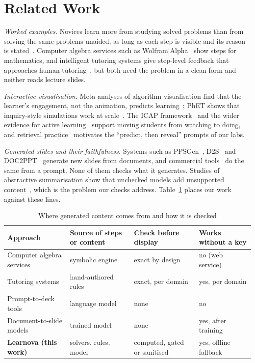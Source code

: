\documentclass[runningheads]{llncs}
\begin{document}
\section{Related Work}
\label{sec:related}
\textit{Worked examples.} Novices learn more from studying solved problems than from solving the same problems unaided, as long as
each step is visible and its reason is stated~\cite{sweller1985,atkinson2000,renkl2014}. Computer algebra services such as
Wolfram$|$Alpha~\cite{wolframalpha} show steps for mathematics, and intelligent tutoring systems give step-level feedback that
approaches human tutoring~\cite{vanlehn2011}, but both need the problem in a clean form and neither reads lecture slides.

\textit{Interactive visualisation.} Meta-analyses of algorithm visualisation find that the learner's engagement, not the animation,
predicts learning~\cite{hundhausen2002,naps2002}; PhET shows that inquiry-style simulations work at scale~\cite{wieman2008}. The
ICAP framework~\cite{chi2014} and the wider evidence for active learning~\cite{freeman2014} support moving students from watching
to doing, and retrieval practice~\cite{roediger2006} motivates the ``predict, then reveal'' prompts of our labs.

\textit{Generated slides and their faithfulness.} Systems such as PPSGen~\cite{hu2015}, D2S~\cite{sun2021} and
DOC2PPT~\cite{fu2022} generate new slides from documents, and commercial tools~\cite{gamma,copilotppt,geminislides,canva} do the
same from a prompt. None of them checks what it generates. Studies of abstractive summarisation show that unchecked models add
unsupported content~\cite{maynez2020,ji2023}, which is the problem our checks address. Table~\ref{tab:related} places our work
against these lines.

\begin{table}[H]
\centering
\caption{Where generated content comes from and how it is checked}
\label{tab:related}
\begin{tabular}{p{3.3cm}p{2.5cm}p{2.6cm}p{2.9cm}}
\toprule
Approach & Source of steps or content & Check before display & Works without a key \\
\midrule
Computer algebra services & symbolic engine & exact by design & no (web service) \\
Tutoring systems & hand-authored rules & exact, per domain & yes, per domain \\
Prompt-to-deck tools & language model & none & no \\
Document-to-slide models & trained model & none & yes, after training \\
\textbf{Learnova (this work)} & solvers, rules, model & computed, gated or sanitised & yes, offline fallback \\
\bottomrule
\end{tabular}
\end{table}
\end{document}
